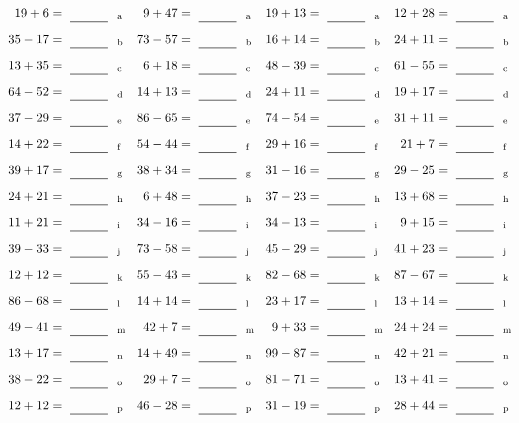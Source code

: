 \documentclass
[
  draft    = true,
  fontsize = 11pt,
  parskip  = half-
]
{scrartcl}
\begin{document}
\clearpage
\begin{align*}
    \pline{19+6}&=\rline{a}
  & \pline{9+47}&=\rline{a}
  & \pline{19+13}&=\rline{a}
  & \pline{12+28}&=\rline{a} \\[1ex]
    \pline{35-17}&=\rline{b}
  & \pline{73-57}&=\rline{b}
  & \pline{16+14}&=\rline{b}
  & \pline{24+11}&=\rline{b} \\[1ex]
    \pline{13+35}&=\rline{c}
  & \pline{6+18}&=\rline{c}
  & \pline{48-39}&=\rline{c}
  & \pline{61-55}&=\rline{c} \\[1ex]
    \pline{64-52}&=\rline{d}
  & \pline{14+13}&=\rline{d}
  & \pline{24+11}&=\rline{d}
  & \pline{19+17}&=\rline{d} \\[1ex]
    \pline{37-29}&=\rline{e}
  & \pline{86-65}&=\rline{e}
  & \pline{74-54}&=\rline{e}
  & \pline{31+11}&=\rline{e} \\[1ex]
    \pline{14+22}&=\rline{f}
  & \pline{54-44}&=\rline{f}
  & \pline{29+16}&=\rline{f}
  & \pline{21+7}&=\rline{f} \\[1ex]
    \pline{39+17}&=\rline{g}
  & \pline{38+34}&=\rline{g}
  & \pline{31-16}&=\rline{g}
  & \pline{29-25}&=\rline{g} \\[1ex]
    \pline{24+21}&=\rline{h}
  & \pline{6+48}&=\rline{h}
  & \pline{37-23}&=\rline{h}
  & \pline{13+68}&=\rline{h} \\[1ex]
    \pline{11+21}&=\rline{i}
  & \pline{34-16}&=\rline{i}
  & \pline{34-13}&=\rline{i}
  & \pline{9+15}&=\rline{i} \\[1ex]
    \pline{39-33}&=\rline{j}
  & \pline{73-58}&=\rline{j}
  & \pline{45-29}&=\rline{j}
  & \pline{41+23}&=\rline{j} \\[1ex]
    \pline{12+12}&=\rline{k}
  & \pline{55-43}&=\rline{k}
  & \pline{82-68}&=\rline{k}
  & \pline{87-67}&=\rline{k} \\[1ex]
    \pline{86-68}&=\rline{l}
  & \pline{14+14}&=\rline{l}
  & \pline{23+17}&=\rline{l}
  & \pline{13+14}&=\rline{l} \\[1ex]
    \pline{49-41}&=\rline{m}
  & \pline{42+7}&=\rline{m}
  & \pline{9+33}&=\rline{m}
  & \pline{24+24}&=\rline{m} \\[1ex]
    \pline{13+17}&=\rline{n}
  & \pline{14+49}&=\rline{n}
  & \pline{99-87}&=\rline{n}
  & \pline{42+21}&=\rline{n} \\[1ex]
    \pline{38-22}&=\rline{o}
  & \pline{29+7}&=\rline{o}
  & \pline{81-71}&=\rline{o}
  & \pline{13+41}&=\rline{o} \\[1ex]
    \pline{12+12}&=\rline{p}
  & \pline{46-28}&=\rline{p}
  & \pline{31-19}&=\rline{p}
  & \pline{28+44}&=\rline{p}
\end{align*}
\end{document}
